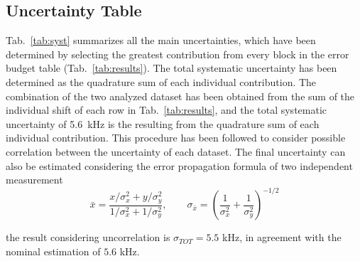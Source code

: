 \subsection{Uncertainty Table}

Tab.~\ref{tab:syst} summarizes all the main uncertainties, which have been determined by selecting the greatest contribution from every block in the error budget table (Tab.~\ref{tab:results}). The total systematic uncertainty has been determined as the quadrature sum of each individual contribution. The combination of the two analyzed dataset has been obtained from the sum of the individual shift of each row in Tab.~\ref{tab:results}, and the total systematic uncertainty of \SI{5.6}{\kilo \hertz} is the resulting from the quadrature sum of each individual contribution. This procedure has been followed to consider possible correlation between the uncertainty of each dataset. The final uncertainty can also be estimated considering the error propagation formula of two independent measurement $$\bar{x} = \frac{x/\sigma_x^2 + y/\sigma_y^2}{1/\sigma_x^2 + 1/\sigma_y^2}, \qquad \sigma_{\bar{x}} = \left(\frac{1}{\sigma_x^2} + \frac{1}{\sigma_y^2}\right)^{-1/2}$$

the result considering uncorrelation is $\sigma_{TOT} = 5.5 $ kHz, in agreement with the nominal estimation of $5.6$ kHz.

\begin{table}[!h]
\centering
{}
\caption{Summary of the uncertainties associated to the measurement of the hyperfine splitting.
\label{tab:syst}}
\end{table}


